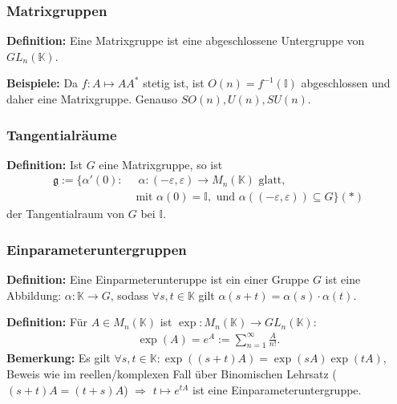 \documentclass[11pt]{beamer}
\begin{document}
\begin{frame}
	\frametitle{Matrixgruppen}
	\textbf{Definition:}
	Eine Matrixgruppe ist eine abgeschlossene
	Untergruppe von $GL_n(\mathbb{K})$. \\[1em] \pause

	\textbf{Beispiele:}
	Da $f:A \mapsto AA^*$ stetig ist, ist $O(n) = f^{-1}(\mathbb{I})$ abgeschlossen
	und daher eine Matrixgruppe. Genauso $SO(n),U(n), SU(n)$. \\[1em]
\end{frame}

\begin{frame}
	\frametitle{Tangentialräume}
	\textbf{Definition:}
	Ist $G$ eine Matrixgruppe, so ist
	\begin{align*}
		\mathfrak{g} := \{ \alpha'(0): & \;\; \alpha:(-\varepsilon, \varepsilon) \rightarrow M_n(\mathbb{K}) \text{ glatt},\\ 							
										&\text{ mit } \alpha(0) = \mathbb{I}, \text{ und } \alpha((-\varepsilon, \varepsilon)) \subseteq G\} (*)
	\end{align*}
  der Tangentialraum von $G$ bei $\mathbb{I}$.
\end{frame}


\begin{frame}
	\frametitle{Einparameteruntergruppen}
	\textbf{Definition:}
	Eine Einparmeterunteruppe ist ein einer Gruppe $G$ ist eine Abbildung:
	$\alpha:\mathbb{K} \rightarrow G$, sodass $\forall s, t \in \mathbb{K}$ gilt
	$\alpha(s+t) = \alpha(s)\cdot \alpha(t)$. \\[1em] \pause
	
	\textbf{Definition:}
	Für $A \in M_n(\mathbb{K})$ ist $\exp: M_n(\mathbb K) \to GL_n(\mathbb K)$:
	\begin{align*}
	\exp(A) = e^A := \sum_{n = 1}^{\infty} \frac{A}{n!}.
	\end{align*} \pause
	\textbf{Bemerkung:}
	Es gilt $\forall s,t\in \mathbb K: \exp((s+t)A) = \exp(sA) \exp(tA)$, Beweis wie im reellen/komplexen Fall über Binomischen Lehrsatz ($(s+t)A = (t+s)A$) $\Rightarrow$ $t\mapsto e^{tA}$ ist eine Einparameteruntergruppe.
\end{frame}
\end{document}
